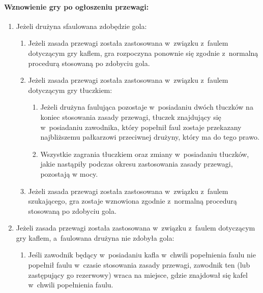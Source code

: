 \documentclass[12pt,a4paper]{article}
\begin{document}
\paragraph{Wznowienie gry po ogłoszeniu przewagi:}

\begin{enumerate}
	\item
	      Jeżeli drużyna sfaulowana zdobędzie gola:

	      \begin{enumerate}
		      \item
		            Jeżeli zasada przewagi została zastosowana w~związku z~faulem
		            dotyczącym gry kaflem, gra rozpoczyna ponownie się zgodnie z~normalną procedurą stosowaną po zdobyciu gola.
		      \item
		            Jeżeli zasada przewagi została zastosowana w~związku z~faulem
		            dotyczącym gry tłuczkiem:

		            \begin{enumerate}
			            \item
			                  Jeżeli drużyna faulująca pozostaje w~posiadaniu dwóch tłuczków na
			                  koniec stosowania zasady przewagi, tłuczek znajdujący się w~posiadaniu zawodnika, który popełnił faul zostaje przekazany
			                  najbliższemu pałkarzowi przeciwnej drużyny, który ma do tego
			                  prawo.
			            \item
			                  Wszystkie zagrania tłuczkiem oraz zmiany w~posiadaniu tłuczków, jakie nastąpiły
			                  podczas okresu zastosowania zasady przewagi, pozostają w mocy.
		            \end{enumerate}
		      \item
		            Jeżeli zasada przewagi została zastosowana w~związku z~faulem
		            szukającego, gra zostaje wznowiona zgodnie z~normalną procedurą
		            stosowaną po zdobyciu gola.
	      \end{enumerate}
	\item
	      Jeżeli zasada przewagi została zastosowana w~związku z~faulem
	      dotyczącym gry kaflem, a~faulowana drużyna nie zdobyła gola:

	      \begin{enumerate}
		      \item
		            Jeśli zawodnik będący w~posiadaniu kafla w~chwili popełnienia faulu nie
		            popełnił faulu w~czasie stosowania zasady przewagi, zawodnik ten
		            (lub zastępujący go rezerwowy) wraca na miejsce, gdzie znajdował się
		            kafel w~chwili popełnienia faulu.


\end{enumerate}
\end{enumerate}
\end{document}
